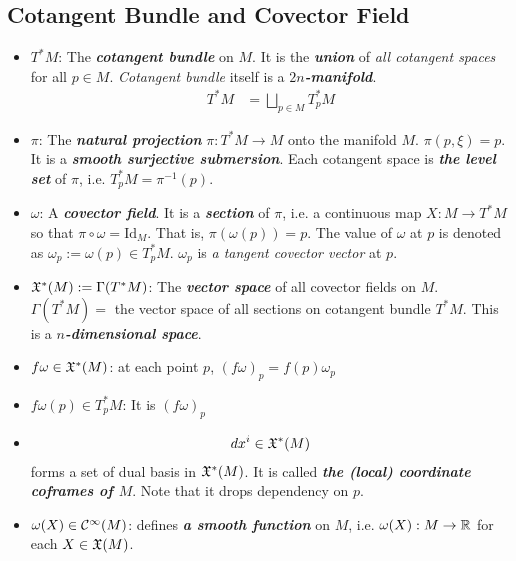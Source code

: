 \documentclass[11pt]{article}
\begin{document}
\subsection{Cotangent Bundle and Covector Field}
\begin{itemize}
\item  $T^{*}M$: \quad The \emph{\textbf{cotangent bundle}} on $M$. It is the \emph{\textbf{union}} of \emph{all cotangent spaces} for all $p\in M$. \emph{Cotangent bundle} itself is a \emph{\textbf{$2n$-manifold}}.
\begin{align*}
T^{*}M &= \bigsqcup_{p\in M}T_p^{*}M
\end{align*}

\item $\pi$: \quad The \emph{\textbf{natural projection}} $\pi: T^{*}M \rightarrow M$ onto the manifold $M$.  $\pi(p, \xi) = p$. It is a \emph{\textbf{smooth surjective submersion}}. Each cotangent space is \emph{\textbf{the level set}} of $\pi$, i.e. $T_p^{*}M = \pi^{-1}(p)$.

\item $\omega$: \quad A \emph{\textbf{covector field}}. It is a \emph{\textbf{section}} of $\pi$, i.e. a continuous map $X: M \rightarrow T^{*}M$ so that $\pi \circ \omega = \text{Id}_{M}$. That is, $\pi(\omega(p)) = p$. The value of $\omega$ at $p$ is denoted as $\omega_p := \omega(p) \in T_p^{*}M$. $\omega_p$ is \emph{a tangent covector vector} at $p$. 

\item ${\mathfrak X}^{*}(M):= \Gamma(T^{*}M)$: \quad The \emph{\textbf{vector space}} of all covector fields on $M$. $\Gamma(T^{*}M)=$  the vector space of all sections on cotangent bundle $T^{*}M$. This is a \emph{\textbf{$n$-dimensional space}}.

\item $f\omega \in {\mathfrak X}^{*}(M)$: \quad at each point $p$, $(f\omega)_p = f(p)\omega_p$

\item $f\omega(p) \in T_p^{*}M$: \quad It is $(f\omega)_p$

\item \begin{align*}
dx^i \in {\mathfrak X}^{*}(M)
\end{align*} forms a set of dual basis in ${\mathfrak X}^{*}(M)$. It is called \emph{\textbf{the (local) coordinate coframes of $M$}}. Note that it drops dependency on $p$.

\item $\omega(X) \in {\mathcal C}^{\infty}(M)$: \quad defines \emph{\textbf{a smooth function}} on $M$, i.e. $\omega(X): M \rightarrow {\mathbb R}$ for each $X \in {\mathfrak X}(M)$.


\end{itemize}
\end{document}
